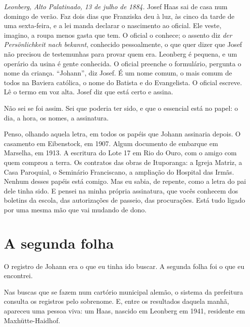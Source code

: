 \documentclass[
  brazilian,
  11pt,
  openany]{book}
\begin{document}
\emph{Leonberg, Alto Palatinado, 13 de julho de 1884.} Josef Haas sai de
casa num domingo de verão. Faz dois dias que Franziska deu à luz, às
cinco da tarde de uma sexta-feira, e a lei manda declarar o nascimento
ao oficial. Ele veste, imagino, a roupa menos gasta que tem. O oficial o
conhece; o assento diz \emph{der Persönlichkeit nach bekannt}, conhecido
pessoalmente, o que quer dizer que Josef não precisou de testemunhas
para provar quem era. Leonberg é pequena, e um operário da usina é gente
conhecida. O oficial preenche o formulário, pergunta o nome da criança.
``Johann'', diz Josef. É um nome comum, o mais comum de todos na Baviera
católica, o nome do Batista e do Evangelista. O oficial escreve. Lê o
termo em voz alta. Josef diz que está certo e assina.

Não sei se foi assim. Sei que poderia ter sido, e que o essencial está
no papel: o dia, a hora, os nomes, a assinatura.

Penso, olhando aquela letra, em todos os papéis que Johann assinaria
depois. O casamento em Eibenstock, em 1907. Algum documento de embarque
em Marselha, em 1913. A escritura do Lote 17 em Rio do Ouro, com o amigo
com quem comprou a terra. Os contratos das obras de Ituporanga: a Igreja
Matriz, a Casa Paroquial, o Seminário Franciscano, a ampliação do
Hospital das Irmãs. Nenhum desses papéis está comigo. Mas eu sabia, de
repente, como a letra do pai dele tinha sido. E pensei na minha própria
assinatura, que vocês conhecem dos boletins da escola, das autorizações
de passeio, das procurações. Está tudo ligado por uma mesma mão que vai
mudando de dono.

\section{A segunda folha}\label{a-segunda-folha}

O registro de Johann era o que eu tinha ido buscar. A segunda folha foi
o que eu encontrei.

Nas buscas que se fazem num cartório municipal alemão, o sistema da
prefeitura consulta os registros pelo sobrenome. E, entre os resultados
daquela manhã, apareceu uma pessoa viva: um Haas, nascido em Leonberg em
1941, residente em Maxhütte-Haidhof.
\end{document}

